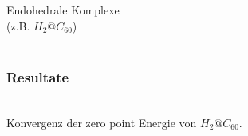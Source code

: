 \documentclass{beamer}
\begin{document}
\begin{frame}
\begin{multicols}{2}
\begin{center}
	Endohedrale Komplexe\\
	(z.B. $H_2@C_{60}$)\\
	\\
	\end{center}
\end{multicols}
\end{frame}

\begin{frame}
\frametitle{Resultate}
\begin{center}
\\ 
Konvergenz der zero point Energie von $H_2@C_{60}$.
\end{center}
\end{frame}
\end{document}
